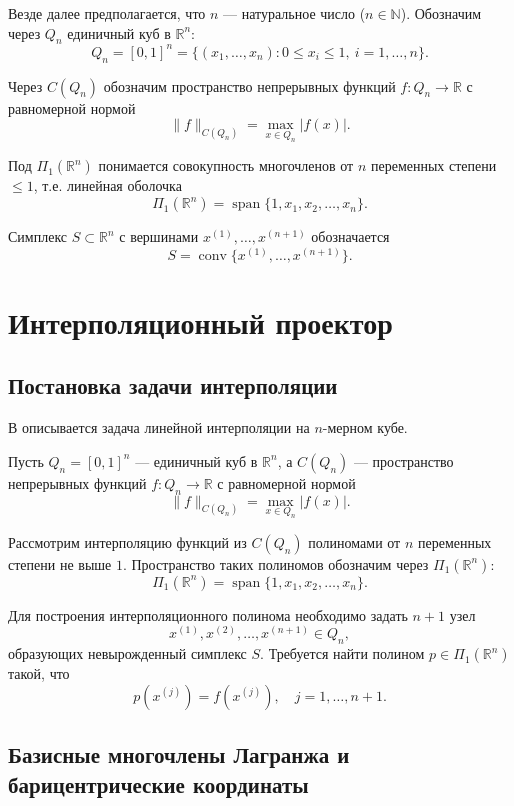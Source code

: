 \documentclass[main]{subfiles}
\begin{document}
Везде далее предполагается, что $n$ — натуральное число ($n \in \mathbb{N}$). Обозначим через $Q_n$ единичный куб в $\mathbb{R}^n$:
\[
Q_n = [0,1]^n = \{(x_1, \dots, x_n) : 0 \le x_i \le 1,\ i = 1,\dots,n\}.
\]

Через $C(Q_n)$ обозначим пространство непрерывных функций $f : Q_n \to \mathbb{R}$ с равномерной нормой
\[
\|f\|_{C(Q_n)} = \max_{x \in Q_n} |f(x)|.
\]

Под $\Pi_1(\mathbb{R}^n)$ понимается совокупность многочленов от $n$ переменных степени $\le 1$, т.е. линейная оболочка
\[
\Pi_1(\mathbb{R}^n) = \operatorname{span}\{1, x_1, x_2, \dots, x_n\}.
\]

Симплекс $S \subset \mathbb{R}^n$ с вершинами $x^{(1)}, \dots, x^{(n+1)}$ обозначается
\[
S = \operatorname{conv}\{x^{(1)}, \dots, x^{(n+1)}\}.
\]

\section{Интерполяционный проектор}

\subsection{Постановка задачи интерполяции}

В \cite{nevsky_geo} описывается задача линейной интерполяции на $n$-мерном кубе.
\par
Пусть $Q_n = [0,1]^n$ — единичный куб в $\mathbb{R}^n$, а $C(Q_n)$ — пространство непрерывных функций $f: Q_n \to \mathbb{R}$ с равномерной нормой
\[
\|f\|_{C(Q_n)} = \max_{x \in Q_n} |f(x)|.
\]

Рассмотрим интерполяцию функций из $C(Q_n)$ полиномами от $n$ переменных степени не выше $1$. Пространство таких полиномов обозначим через $\Pi_1(\mathbb{R}^n)$:
\[
\Pi_1(\mathbb{R}^n) = \operatorname{span}\{1, x_1, x_2, \dots, x_n\}.
\]

Для построения интерполяционного полинома необходимо задать $n+1$ узел
\[
x^{(1)}, x^{(2)}, \dots, x^{(n+1)} \in Q_n,
\]
образующих невырожденный симплекс $S$. Требуется найти полином $p \in \Pi_1(\mathbb{R}^n)$ такой, что
\[
p(x^{(j)}) = f(x^{(j)}), \quad j = 1, \dots, n+1.
\]

\subsection{Базисные многочлены Лагранжа и барицентрические координаты}
\end{document}
